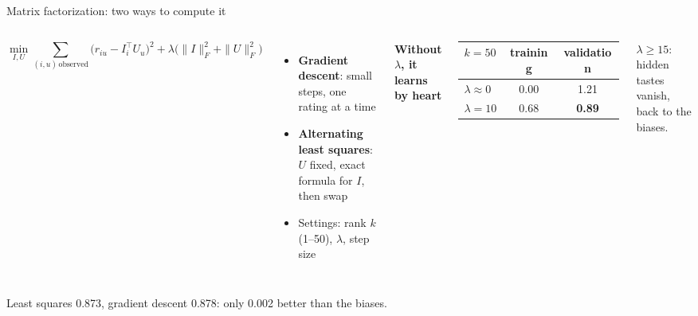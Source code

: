 \documentclass[aspectratio=169,11pt]{beamer}
\newcommand{\key}[1]{\textcolor{accent}{\textbf{#1}}}
\newcommand{\muted}[1]{\textcolor{soft}{#1}}
\newcommand{\takeaway}[1]{\vfill\begin{center}\colorbox{accent!8}{\parbox{0.9\textwidth}{\centering #1}}\end{center}}
\begin{document}
\begin{frame}{Matrix factorization: two ways to compute it}
\begin{columns}[c]
\[
  \min_{I,U} \sum_{(i,u)\,\text{observed}} \bigl(r_{iu} - I_i^\top U_u\bigr)^2 + \lambda\bigl(\|I\|_F^2 + \|U\|_F^2\bigr)
\]
\begin{itemize}
  \item \textbf{Gradient descent}: small steps, one rating at a time
  \item \textbf{Alternating least squares}: $U$ fixed, exact formula for $I$, then swap
  \item Settings: rank $k$ (1--50), $\lambda$, step size
\end{itemize}
\textbf{Without $\lambda$, it learns by heart}\\[0.3em]
\small
\begin{tabular}{@{}lcc@{}}
\toprule
$k = 50$ & training & validation \\
\midrule
$\lambda \approx 0$ & 0.00 & 1.21 \\
$\lambda = 10$ & 0.68 & \key{0.89} \\
\bottomrule
\end{tabular}

\vspace{0.4em}
\muted{\footnotesize $\lambda \geq 15$: hidden tastes vanish, back to the biases.}
\end{columns}
\takeaway{Least squares 0.873, gradient descent 0.878: only 0.002 better than the biases.}
\end{frame}
\end{document}
